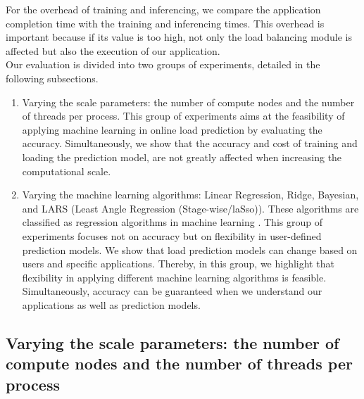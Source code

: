 For the overhead of training and inferencing, we compare the application completion time with the training and inferencing times. This overhead is important because if its value is too high, not only the load balancing module is affected but also the execution of our application.\\

Our evaluation is divided into two groups of experiments, detailed in the following subsections.
\begin{enumerate} \label{enum:exp_vayring}
	\item Varying the scale parameters: the number of compute nodes and the number of threads per process. This group of experiments aims at the feasibility of applying machine learning in online load prediction by evaluating the accuracy. Simultaneously, we show that the accuracy and cost of training and loading the prediction model, are not greatly affected when increasing the computational scale.
	\item Varying the machine learning algorithms: Linear Regression, Ridge, Bayesian, and LARS (Least Angle Regression (Stage-wise/laSso)). These algorithms are classified as regression algorithms in machine learning \cite{bonaccorso2017mlalgorithms}. This group of experiments focuses not on accuracy but on flexibility in user-defined prediction models. We show that load prediction models can change based on users and specific applications. Thereby, in this group, we highlight that flexibility in applying different machine learning algorithms is feasible. Simultaneously, accuracy can be guaranteed when we understand our applications as well as prediction models.
\end{enumerate}

\subsection{Varying the scale parameters: the number of compute nodes and the number of threads per process}
\label{subsec:exp_loadpred_variedscales}

